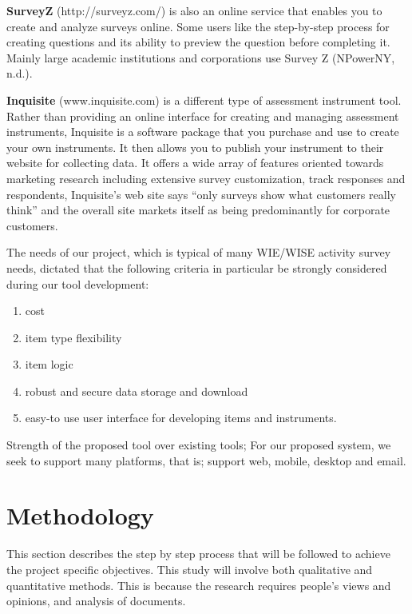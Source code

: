 \documentclass[a4paper,12pt]{article}
\begin{document}
\par
{\bf SurveyZ} (http://surveyz.com/) is also an online service that enables you to create and analyze
surveys online. Some users like the step-by-step process for creating questions and its ability to preview the question before completing it. Mainly large academic institutions and corporations use Survey Z (NPowerNY, n.d.).

\par
{\bf Inquisite} (www.inquisite.com) is a different type of assessment instrument tool. Rather than
providing an online interface for creating and managing assessment instruments, Inquisite is a
software package that you purchase and use to create your own instruments. It then allows you to
publish your instrument to their website for collecting data. It offers a wide array of features
oriented towards marketing research including extensive survey customization, track responses
and respondents, Inquisite’s web site says “only surveys show what customers really think” and
the overall site markets itself as being predominantly for corporate customers.

\par
The needs of our project, which is typical of many WIE/WISE activity survey needs,
dictated that the following criteria in particular be strongly considered during our tool development:
\begin{enumerate}[label=(\roman*)]
\item  cost 
\item item type flexibility
\item item logic 
\item robust and secure data storage and download
\item easy-to use user interface for developing items and instruments.
\end{enumerate}

Strength of the proposed tool over existing tools;
For our proposed system, we seek to support many platforms, that is; support web, mobile, desktop and email.
\newpage
\section{Methodology}
This section describes the step by step process that will be followed to achieve the project specific objectives. This study will involve both qualitative and quantitative methods. This is because the research requires people’s views and opinions, and analysis of documents.
\end{document}
